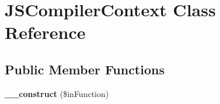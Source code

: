 \hypertarget{class_j_s_compiler_context}{
\section{JSCompilerContext Class Reference}
\label{class_j_s_compiler_context}
}
\subsection*{Public Member Functions}
\begin{DoxyCompactItemize}
\item 
\hypertarget{class_j_s_compiler_context_a0f1134d4dfdb0836648cbb8a8f80e722}{
{\bfseries \_\-\_\-construct} (\$inFunction)}
\label{class_j_s_compiler_context_a0f1134d4dfdb0836648cbb8a8f80e722}

\end{DoxyCompactItemize}
